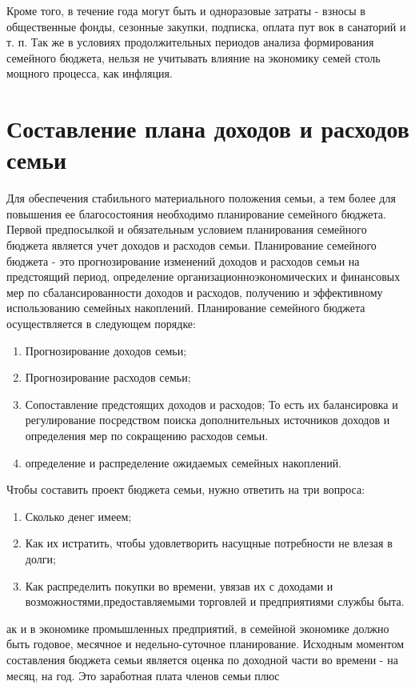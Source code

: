Кроме того, в течение года могут быть и одноразовые затраты - взносы в
общественные фонды, сезонные закупки, подписка, оплата пут вок в санаторий и т. п.
Так же в условиях продолжительных периодов анализа формирования семейного бюджета, нельзя не учитывать влияние на экономику семей столь
мощного процесса, как инфляция.

\section{Составление плана доходов и расходов семьи}
Для обеспечения стабильного материального положения семьи, а тем более для повышения ее благосостояния необходимо планирование семейного
бюджета.
Первой предпосылкой и обязательным условием планирования семейного
бюджета является учет доходов и расходов семьи.
Планирование семейного бюджета - это прогнозирование изменений доходов и расходов семьи на предстоящий период, определение организационноэкономических и финансовых мер по сбалансированности доходов и расходов,
получению и эффективному использованию семейных накоплений.
Планирование семейного бюджета осуществляется в следующем порядке:
\begin{enumerate}
\item Прогнозирование доходов семьи;
\item Прогнозирование расходов семьи;
\item Сопоставление предстоящих доходов и расходов;
То есть их балансировка и регулирование посредством поиска дополнительных источников доходов и определения мер по сокращению расходов семьи.
\item определение и распределение ожидаемых семейных накоплений.
\end{enumerate}
Чтобы составить проект бюджета семьи, нужно ответить на три вопроса:
\begin{enumerate}
\item Сколько денег имеем;
\item Как их истратить, чтобы удовлетворить насущные потребности не влезая в долги;
\item Как распределить покупки во времени, увязав их с доходами и возможностями,предоставляемыми торговлей и предприятиями службы быта.
\end{enumerate}
ак и в экономике промышленных предприятий, в семейной экономике
должно быть годовое, месячное и недельно-суточное планирование. Исходным моментом составления бюджета семьи является оценка по доходной части во времени - на месяц, на год. Это заработная плата членов семьи плюс

